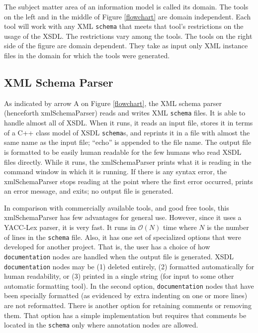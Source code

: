 \documentclass[preprint,12pt]{elsarticle}
\begin{document}
The subject matter area of an information model is called its domain. The
tools on the left and in the middle of Figure \ref{flowchart} are domain
independent. Each tool will work with any XML {\tt schema} that meets that
tool's restrictions on the usage of the XSDL. The restrictions vary among
the tools. The tools on the right side of the figure are domain dependent.
They take as input only XML instance files in the domain for which the
tools were generated.

\subsection{XML Schema Parser}
\label{schemaParser}

As indicated by arrow A on Figure \ref{flowchart}, the XML schema parser
(henceforth xmlSchemaParser) reads and writes XML {\tt schema} files. It is
able to handle almost all of XSDL. When it runs, it reads an input file,
stores it in terms of a C++ class model of XSDL {\tt schema}s, and reprints
it in a file with almost the same name as the input file; ``echo'' is
appended to the file name. The output file is formatted to be easily human
readable for the few humans who read XSDL files directly. While it runs,
the xmlSchemaParser prints what it is reading in the command window in
which it is running. If there is any syntax error, the xmlSchemaParser
stops reading at the point where the first error occurred, prints an error
message, and exits; no output file is generated.

In comparison with commercially available tools, and good free tools, this
xmlSchemaParser has few advantages for general use. However, since it uses
a YACC-Lex parser, it is very fast. It runs in $\mathcal{O}{(N)}$ time
where ${N}$ is the number of lines in the {\tt schema} file. Also, it has
one set of specialized options that were developed for another project.
That is, the user has a choice of how {\tt documentation} nodes are handled
when the output file is generated. XSDL {\tt documentation} nodes may be
(1) deleted entirely, (2) formatted automatically for human readability, or
(3) printed in a single string (for input to some other automatic
formatting tool). In the second option, {\tt documentation} nodes that have
been specially formatted (as evidenced by extra indenting on one or more
lines) are not reformatted. There is another option for retaining comments
or removing them. That option has a simple implementation but requires that
comments be located in the {\tt schema} only where annotation nodes are
allowed.
\end{document}
